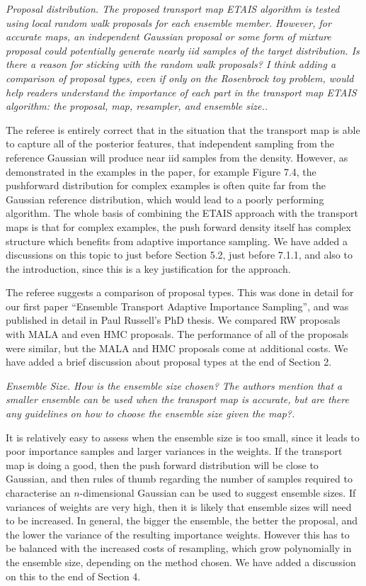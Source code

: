 \documentclass{article}
\newcommand{\comment}[2]{\vspace{0.6cm}{\bf Comment:} {\it #1.}

\vspace{0.3cm}{\bf Answer:} #2}
\begin{document}

\comment{Proposal distribution. The proposed transport map ETAIS algorithm is tested using local random walk proposals for each ensemble member. However, for accurate maps, an independent Gaussian proposal or some form of mixture proposal could potentially generate nearly iid samples of the target distribution. Is there a reason for sticking with the random walk proposals? I think adding a comparison of proposal types, even if only on the Rosenbrock toy problem, would help readers understand the importance of each part in the transport map ETAIS algorithm: the proposal, map, resampler, and ensemble size.}{The referee is entirely correct that in the situation that the transport map is able to capture all of the posterior features, that independent sampling from the reference Gaussian will produce near iid samples from the density. However, as demonstrated in the examples in the paper, for example Figure 7.4, the pushforward distribution for complex examples is often quite far from the Gaussian reference distribution, which would lead to a poorly performing algorithm. The whole basis of combining the ETAIS approach with the transport maps is that for complex examples, the push forward density itself has complex structure which benefits from adaptive importance sampling. We have added a discussions on this topic to just before Section 5.2, just before 7.1.1, and also to the introduction, since this is a key justification for the approach.

The referee suggests a comparison of proposal types. This was done in detail for our first paper ``Ensemble Transport Adaptive Importance Sampling'', and was published in detail in Paul Russell's PhD thesis. We compared RW proposals with MALA and even HMC proposals. The performance of all of the proposals were similar, but the MALA and HMC proposals come at additional costs. We have added a brief discussion about proposal types at the end of Section 2.}


\comment{Ensemble Size. How is the ensemble size chosen? The authors mention that a smaller ensemble can be used when the transport map is accurate, but are there any guidelines on how to choose the ensemble size given the map?}{It is relatively easy to assess when the ensemble size is too small, since it leads to poor importance samples and larger variances in the weights. If the transport map is doing a good, then the push forward distribution will be close to Gaussian, and then rules of thumb regarding the number of samples required to characterise an $n$-dimensional Gaussian can be used to suggest ensemble sizes. If variances of weights are very high, then it is likely that ensemble sizes will need to be increased. In general, the bigger the ensemble, the better the proposal, and the lower the variance of the resulting importance weights. However this has to be balanced with the increased costs of resampling, which grow polynomially in the ensemble size, depending on the method chosen. We have added a discussion on this to the end of Section 4.}
\end{document}
